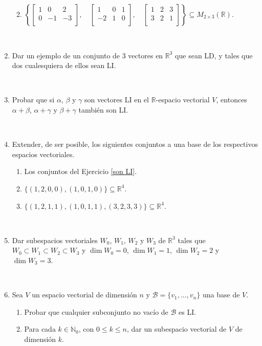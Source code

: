 \documentclass[12pt]{amsart}
\begin{document}
\begin{enumerate}
\begin{enumerate}
	\vspace{0.2cm}

	\item $\left\{  \begin{bmatrix} 1 & 0 & 2 \\ 0 & -1 & -3 \\ \end{bmatrix}, \quad
	\begin{bmatrix} 1 & 0 & 1 \\ -2 & 1 & 0 \\ \end{bmatrix}, \quad
	\begin{bmatrix} 1 & 2 & 3 \\ 3 & 2 & 1 \\ \end{bmatrix} \right\}\subseteq M_{2\times 3}(\mathbb{R})$.
\end{enumerate}

\

\item Dar un ejemplo de un conjunto de 3 vectores en $\mathbb{R}^3$ que sean LD, y tales que dos cualesquiera de ellos sean LI.

\

\item  Probar que si $\alpha$, $\beta$ y $\gamma$ son vectores LI en el $\mathbb{R}$-espacio vectorial $V$, entonces $\alpha +\beta$, $\alpha +\gamma$ y $\beta +\gamma $ tambi\'en son LI.

\

\item Extender, de ser posible, los siguientes conjuntos a una base de los respectivos espacios vectoriales.

\begin{enumerate}
	\item Los conjuntos del Ejercicio \eqref{son LI}.
	\item\label{10b} $\{ (1,2,0,0),(1,0,1,0) \}\subseteq\mathbb{R}^4$.
	\item\label{10c} $\{ (1,2,1,1),(1,0,1,1),(3,2,3,3)\}\subseteq\mathbb{R}^4$.
\end{enumerate}

\

\item Dar subespacios vectoriales $W_0$, $W_1$, $W_2$ y $W_3$ de $\mathbb{R}^3$ tales que $W_0\subset W_1\subset W_2\subset W_3$ y $\dim W_0=0$, $\dim W_1=1$, $\dim W_2=2$ y $\dim W_3=3$.

\

\item Sea $V$ un espacio vectorial de dimensi\'on $n$ y $\mathcal{B}=\{v_1, ..., v_n\}$ una base de $V$.
\begin{enumerate}
 \item Probar que cualquier subconjunto no vac\'io de $\mathcal{B}$ es LI.
 \item Para cada $k\in\mathbb{N}_0$,  con $0\leq k\leq n$, dar un subespacio vectorial de $V$ de dimensi\'on $k$.
\end{enumerate}


\end{enumerate}
\end{document}
